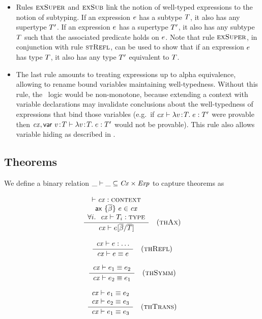 \begin{itemize}
\item
Rules $\textsc{exSuper}$ and $\textsc{exSub}$ link the notion of well-typed expressions to the
notion of subtyping. If an expression $e$ has a subtype $T$, it also
has any supertype $T'$. If an expression $e$ has a supertype $T'$,
it also has any subtype $T$ such that the associated predicate holds on
$e$. Note that rule $\textsc{exSuper}$, in conjunction with rule $\textsc{stRefl}$, can
be used to show that if an expression $e$ has type $T$, it also has any
type $T'$ equivalent to $T$.
\item
The last rule amounts to treating expressions up to alpha equivalence,
allowing to rename bound variables maintaining well-typedness. Without this
rule, the \MS\ logic would be non-monotone, because extending a context with
variable declarations may invalidate conclusions about the well-typedness of
expressions that bind those variables (e.g.\ if $\mathit{cx}\vdash\lambda v\!:\!T.\;e:T'$ were
provable then $\mathit{cx},\mathsf{var}\ v\!:\!T\vdash\lambda v\!:\!T.\;e:T'$ would not be
provable). This rule also allows variable hiding as described in \cite{lm}.
\end{itemize}

\subsection{Theorems}

We define a binary relation $\_\vdash\_\subseteq\mathit{Cx}\times\mathit{Exp}$ to capture theorems
as

\[
\frac{\begin{array}{c}\vdash\mathit{cx}:\textsc{context}\\\mathsf{ax}\ \{\overline{\beta}\}\ e\in\mathit{cx}\\\forall i.\ \ \mathit{cx}\vdash T_i:\textsc{type}\end{array}}{\mathit{cx}\vdash e[\overline{\beta}/\overline{T}]}\quad\mbox{(\textsc{thAx})}
\]


\[
\frac{\begin{array}{c}\mathit{cx}\vdash e:\ldots\end{array}}{\mathit{cx}\vdash e\equiv e}\quad\mbox{(\textsc{thRefl})}
\]

\[
\frac{\begin{array}{c}\mathit{cx}\vdash e_1\equiv e_2\end{array}}{\mathit{cx}\vdash e_2\equiv e_1}\quad\mbox{(\textsc{thSymm})}
\]

\[
\frac{\begin{array}{c}\mathit{cx}\vdash e_1\equiv e_2\\\mathit{cx}\vdash e_2\equiv e_3\end{array}}{\mathit{cx}\vdash e_1\equiv e_3}\quad\mbox{(\textsc{thTrans})}
\]

